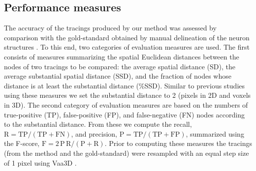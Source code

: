 \subsection{Performance measures}
\label{subsec:performance-measures}
The accuracy of the tracings produced by our method was assessed by comparison with the gold-standard obtained by manual delineation of the neuron structures \cite{gillette2011diademchallenge, meijering2004design}. To this end, two categories of evaluation measures are used. The first consists of measures summarizing the spatial Euclidean distances between the nodes of two tracings to be compared: the average spatial distance (SD), the average substantial spatial distance (SSD), and the fraction of nodes whose distance is at least the substantial distance (\%SSD). Similar to previous studies using these measures \cite{peng2010v3d} we set the substantial distance to 2 (pixels in 2D and voxels in 3D). The second category of evaluation measures are based on the numbers of true-positive (TP), false-positive (FP), and false-negative (FN) nodes according to the substantial distance. From these we compute the recall, $\textrm{R}=\textrm{TP}/(\textrm{TP}+\textrm{FN})$, and precision, $\textrm{P}=\textrm{TP}/(\textrm{TP}+\textrm{FP})$, summarized using the F-score, $\textrm{F}=2\,\textrm{P}\,\textrm{R}/(\textrm{P}+\textrm{R})$. Prior to computing these measures the tracings (from the method and the gold-standard) were resampled with an equal step size of 1 pixel using Vaa3D \cite{peng2010v3d}.

